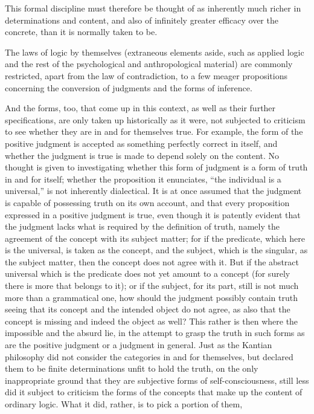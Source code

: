 This formal discipline must therefore be thought of
as inherently much richer in determinations and content,
and also of infinitely greater efficacy over the concrete,
than it is normally taken to be.

The laws of logic by themselves
(extraneous elements aside, such as applied logic
and the rest of the psychological and anthropological material)
are commonly restricted, apart from the law of contradiction,
to a few meager propositions concerning
the conversion of judgments and the forms of inference.

And the forms, too, that come up in this context,
as well as their further specifications,
are only taken up historically as it were,
not subjected to criticism to see whether
they are in and for themselves true.
For example, the form of the positive judgment
is accepted as something perfectly correct in itself,
and whether the judgment is true is made
to depend solely on the content.
No thought is given to investigating
whether this form of judgment is
a form of truth in and for itself;
whether the proposition it enunciates,
“the individual is a universal,”
is not inherently dialectical.
It is at once assumed that
the judgment is capable of possessing
truth on its own account,
 and that every proposition expressed in a positive
judgment is true,
even though it is patently evident that the judgment lacks
what is required by the definition of truth,
 namely the agreement of the concept with its subject matter;
for if the predicate, which here is the universal,
is taken as the concept,
and the subject, which is the singular,
as the subject matter,
then the concept does not agree with it.
But if the abstract universal which is the predicate
does not yet amount to a concept
(for surely there is more that belongs to it);
or if the subject, for its part,
still is not much more than a grammatical one,
how should the judgment
possibly contain truth seeing that its concept and the intended object do
not agree, as also that the concept is missing and indeed the object as well?
This rather is then where the impossible and the absurd lie,
in the attempt to grasp the truth in such forms as are
the positive judgment or a judgment in general.
Just as the Kantian philosophy did not consider
the categories in and for themselves,
but declared them to be finite determinations unfit
to hold the truth, on the only inappropriate ground
that they are subjective forms of self-consciousness,
still less did it subject to criticism
the forms of the concepts that make up
the content of ordinary logic.
What it did, rather, is to pick a portion of them,
